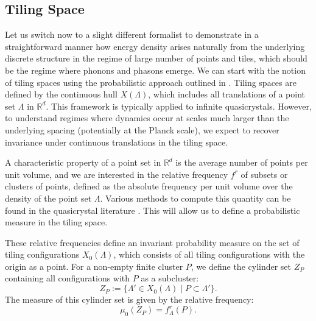 \documentclass[sn-mathphys-num]{sn-jnl}%
\begin{document}
\subsection{Tiling Space}

Let us switch now to a slight different formalist to demonstrate in a straightforward manner how energy density arises naturally from the underlying discrete structure in the regime of large number of points and tiles, which should be the regime where phonons and phasons emerge. We can start with the notion of tiling spaces using the probabilistic approach outlined in \cite{BaakeGrimm}. Tiling spaces are defined by the continuous hull $X(\varLambda)$, which includes all translations of a point set $\varLambda$ in $\mathbb{R}^{d}$. This framework is typically applied to infinite quasicrystals. However, to understand regimes where dynamics occur at scales much larger than the underlying spacing (potentially at the Planck scale), we expect to recover invariance under continuous translations in the tiling space.

A characteristic property of a point set in $\mathbb{R}^{d}$ is the average number of points per unit volume, and we are interested in the relative frequency $f^{r}$ of subsets or clusters of points, defined as the absolute frequency per unit volume over the density of the point set $\varLambda$. Various methods to compute this quantity can be found in the quasicrystal literature \cite{BaakeGrimm}. This will allow us to define a probabilistic measure in the tiling space.


These relative frequencies define an invariant probability measure on the set of tiling configurations $X_{0}(\varLambda)$, which consists of all tiling configurations with the origin as a point. For a non-empty finite cluster $P$, we define the cylinder set $Z_{P}$ containing all configurations with $P$ as a subcluster:
\begin{equation}
Z_{P}:=\{\varLambda'\in X_{0}(\varLambda)\mid P\subset\varLambda'\}.
\end{equation}
The measure of this cylinder set is given by the relative frequency:
\begin{equation}
\mu_{0}(Z_{P})=f_{\varLambda}^{r}(P).
\end{equation}
\end{document}
